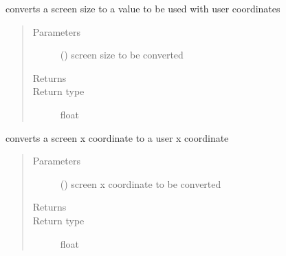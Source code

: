 \documentclass[letterpaper,10pt,english]{sphinxmanual}
\begin{document}
\begin{fulllineitems}
\begin{fulllineitems}
\label{\detokenize{Reference:salabim.Environment.screen_to_usercoordinates_size}}
converts a screen size to a value to be used with user coordinates
\begin{quote}\begin{description}
\item[{Parameters}] \leavevmode
{} () \textendash{} screen size to be converted

\item[{Returns}] \leavevmode
{}

\item[{Return type}] \leavevmode
float

\end{description}\end{quote}

\end{fulllineitems}


\begin{fulllineitems}
\label{\detokenize{Reference:salabim.Environment.screen_to_usercoordinates_x}}
converts a screen x coordinate to a user x coordinate
\begin{quote}\begin{description}
\item[{Parameters}] \leavevmode
{} () \textendash{} screen x coordinate to be converted

\item[{Returns}] \leavevmode
{}

\item[{Return type}] \leavevmode
float

\end{description}\end{quote}

\end{fulllineitems}



\end{fulllineitems}
\end{document}

